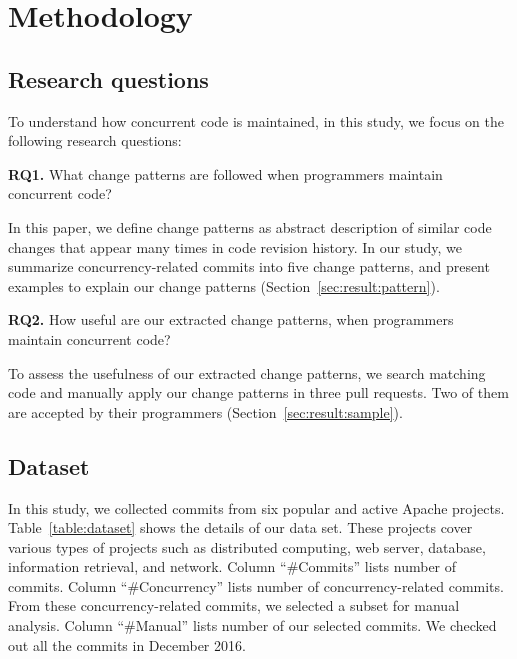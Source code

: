\section{Methodology}
\label{sec:method}
\subsection{Research questions}
\label{sec:method:rq}
To understand how concurrent code is maintained, in this study, we focus on the following research questions:

\textbf{RQ1.} What change patterns are followed when programmers maintain concurrent code?


In this paper, we define change patterns as abstract description of similar code changes that appear many times in code revision history.  In our study, we summarize concurrency-related commits into five change patterns, and present examples to explain our change patterns (Section~\ref{sec:result:pattern}).

\textbf{RQ2.} How useful are our extracted change patterns, when programmers maintain concurrent code?

To assess the usefulness of our extracted change patterns, we search matching code and manually apply our change patterns in three pull requests. Two of them are accepted by their programmers (Section~\ref{sec:result:sample}).



\subsection{Dataset}
\label{sec:method:data}
In this study, we collected commits from six popular and active Apache projects. Table~\ref{table:dataset} shows the details of our data set. These projects cover various types of projects such as distributed computing, web server, database, information retrieval, and network. Column ``\#Commits'' lists number of commits. Column ``\#Concurrency'' lists number of concurrency-related commits. From these concurrency-related commits, we selected a subset for manual analysis. Column ``\#Manual'' lists number of our selected commits. We checked out all the commits in December 2016. %

